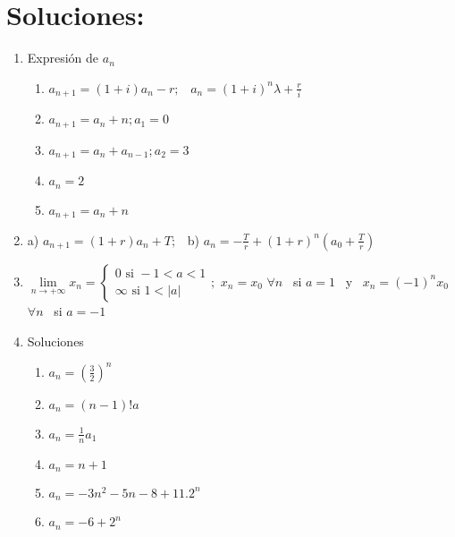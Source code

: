 \documentclass{article}
\begin{document}
\newpage

\section{Soluciones:}

\begin{enumerate}
\item Expresi\'{o}n de $a_{n}$

\begin{enumerate}
\item $a_{n+1}=\left( 1+i\right) a_{n}-r;$ \ $a_{n}=\left( 1+i\right)
^{n}\lambda +\frac{r}{i}$

\item $a_{n+1}=a_{n}+n;a_{1}=0$

\item $a_{n+1}=a_{n}+a_{n-1};a_{2}=3$

\item $a_{n}=2$

\item $a_{n+1}=a_{n}+n$
\end{enumerate}

\item a) $a_{n+1}=\left( 1+r\right) a_{n}+T;$ \ b) $a_{n}=-\frac{T}{r}%
+\left( 1+r\right) ^{n}\left( a_{0}+\frac{T}{r}\right) $

\item $\underset{n\rightarrow +\infty }{\lim }x_{n}=\left\{ 
\begin{array}{c}
0\text{ \ si }-1<a<1 \\ 
\infty \text{ \ \ si }1<\left\vert a\right\vert%
\end{array}%
\right. ;$ $x_{n}=x_{0}$ $\forall n$ \ si $a=1$ \ y \ $x_{n}=\left(
-1\right) ^{n}x_{0}$ $\forall n$ \ si $a=-1$

\item Soluciones

\begin{enumerate}
\item $a_{n}=\left( \frac{3}{2}\right) ^{n}$

\item $a_{n}=\left( n-1\right) !a$

\item $a_{n}=\frac{1}{n}a_{1}$

\item $a_{n}=n+1$

\item $a_{n}=-3n^{2}-5n-8+11.2^{n}$

\item $a_{n}=-6+2^{n}$


\end{enumerate}
\end{enumerate}
\end{document}
